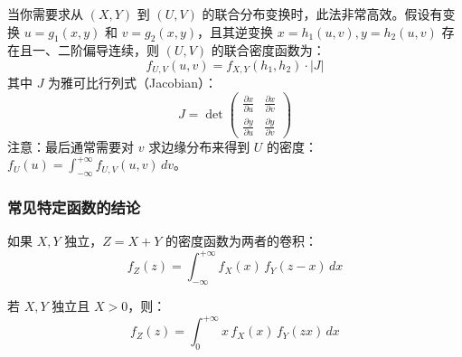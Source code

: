 \begin{theorem}
当你需要求从 $(X, Y)$ 到 $(U, V)$ 的联合分布变换时，此法非常高效。假设有变换 $u = g_1(x, y)$ 和 $v = g_2(x, y)$，且其逆变换 $x = h_1(u, v), y = h_2(u, v)$ 存在且一、二阶偏导连续，则 $(U, V)$ 的联合密度函数为：
\begin{equation}
	f_{U,V}(u, v) = f_{X,Y}(h_1, h_2)\cdot |J|
	\label{eq:第三章:变量代换}
\end{equation}
其中 $J$ 为雅可比行列式（Jacobian）：
\begin{equation}
	J = \det \begin{pmatrix} \frac{\partial x}{\partial u} & \frac{\partial x}{\partial v} \\[1ex] \frac{\partial y}{\partial u} & \frac{\partial y}{\partial v} \end{pmatrix}
	\label{eq:第三章:雅可比}
\end{equation}
注意：最后通常需要对 $v$ 求边缘分布来得到 $U$ 的密度：$f_U(u) = \int_{-\infty}^{+\infty} f_{U,V}(u, v)\,dv$。
\end{theorem}

\subsubsection{常见特定函数的结论}
\begin{theorem}
如果 $X, Y$ 独立，$Z = X + Y$ 的密度函数为两者的卷积：
\begin{equation}
	f_Z(z) = \int_{-\infty}^{+\infty} f_X(x)\,f_Y(z-x)\,dx
	\label{eq:第三章:卷积}
\end{equation}
\end{theorem}

\begin{theorem}[商的分布：$Z = Y / X$]
若 $X, Y$ 独立且 $X > 0$，则：
\begin{equation}
	f_Z(z) = \int_{0}^{+\infty} x\,f_X(x)\,f_Y(zx)\,dx
	\label{eq:第三章:商分布}
\end{equation}
\end{theorem}